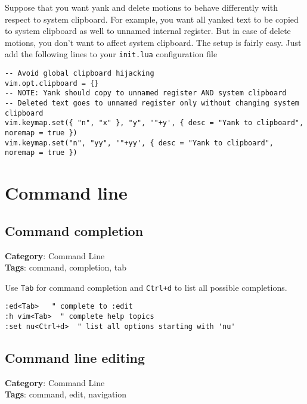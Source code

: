 {{{Suppose that you want yank and delete motions to behave differently with respect to system clipboard. For example, you want all yanked text to be copied to system clipboard as well to unnamed internal register. But in case of delete motions, you don't want to affect system clipboard. The setup is fairly easy. Just add the following lines to your {\footnotesize \Verb§init.lua§} configuration file

\begin{Exa*}{}
\begin{Verbatim}[fontsize=\footnotesize, breaklines, breakanywhere]
-- Avoid global clipboard hijacking
vim.opt.clipboard = {}
-- NOTE: Yank should copy to unnamed register AND system clipboard
-- Deleted text goes to unnamed register only without changing system clipboard
vim.keymap.set({ "n", "x" }, "y", '"+y', { desc = "Yank to clipboard", noremap = true })
vim.keymap.set("n", "yy", '"+yy', { desc = "Yank to clipboard", noremap = true })
\end{Verbatim}
\end{Exa*}

\chapter{Command line}
\section{Command completion}

\textbf{Category}: Command Line\\ \textbf{Tags}: command, completion, tab
\vspace{0.5cm}

Use {\footnotesize \Verb§Tab§} for command completion and {\footnotesize \Verb§Ctrl+d§} to list all possible completions.

\begin{Exa*}{}
\begin{Verbatim}[fontsize=\footnotesize, breaklines, breakanywhere]
:ed<Tab>   " complete to :edit
:h vim<Tab>  " complete help topics
:set nu<Ctrl+d>  " list all options starting with 'nu'
\end{Verbatim}
\end{Exa*}

\section{Command line editing}

\textbf{Category}: Command Line\\ \textbf{Tags}: command, edit, navigation
\vspace{0.5cm}

}}}
